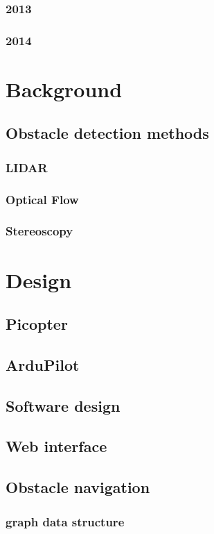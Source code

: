 \documentclass[a4paper, 12pt, titlepage]{article}
\begin{document}
		\subsubsection{2013}
		\subsubsection{2014}

\section{Background}
    \subsection{Obstacle detection methods}
        \subsubsection{LIDAR}
        \subsubsection{Optical Flow}
        \subsubsection{Stereoscopy}
        
\section{Design}
    \subsection{Picopter}
    \subsection{ArduPilot}
    \subsection{Software design}
    \subsection{Web interface}
    \subsection{Obstacle navigation}
        \subsubsection{graph data structure}
\end{document}
